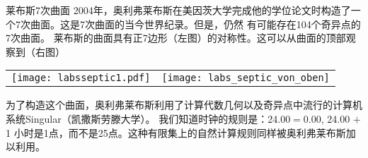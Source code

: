 ﻿\begin{surferPage}{莱布斯7次曲面}
2004年，奥利弗莱布斯在美因茨大学完成他的学位论文时构造了一个7次曲面。这是7次曲面的当今世界纪录。但是，仍然
有可能存在104个奇异点的7次曲面。  莱布斯的曲面具有正7边形（左图）的对称性。这可以从曲面的顶部观察到（右图）

    \vspace*{-0.3em}
    \begin{center}
      \begin{tabular}{c@{\qquad}c}
        \texttt{[image: labsseptic1.pdf]}
        &
        \texttt{[image: labs\_septic\_von\_oben]}
      \end{tabular}
    \end{center}
    \vspace*{-0.3em}

为了构造这个曲面，奥利弗莱布斯利用了计算代数几何以及奇异点中流行的计算机系统{\sc Singular}（凯撒斯劳滕大学）。
我们知道时钟的规则是：24.00$=$0.00, 24.00 $+$ 1 小时是1点，而不是25点。这种有限集上的自然计算规则同样被奥利弗莱布斯加以利用。
\end{surferPage}
